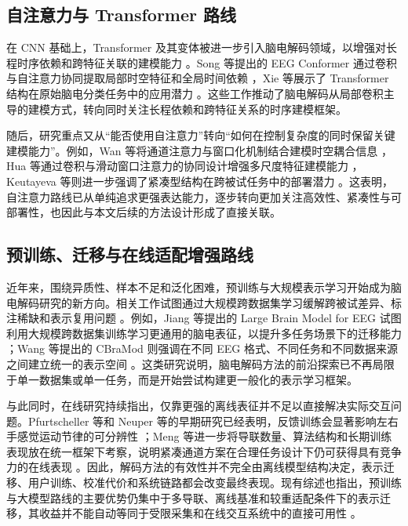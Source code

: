 \subsection{自注意力与 Transformer 路线}

在 CNN 基础上，Transformer 及其变体被进一步引入脑电解码领域，以增强对长程时序依赖和跨特征关联的建模能力 \cite{vaswani2017attention}。Song 等提出的 EEG Conformer 通过卷积与自注意力协同提取局部时空特征和全局时间依赖 \cite{songEEG2022}，Xie 等展示了 Transformer 结构在原始脑电分类任务中的应用潜力 \cite{xie_transformer-based_2022}。这些工作推动了脑电解码从局部卷积主导的建模方式，转向同时关注长程依赖和跨特征关系的时序建模框架。

随后，研究重点又从“能否使用自注意力”转向“如何在控制复杂度的同时保留关键建模能力”。例如，Wan 等将通道注意力与窗口化机制结合建模时空耦合信息 \cite{wan2023novel}，Hua 等通过卷积与滑动窗口注意力的协同设计增强多尺度特征建模能力 \cite{hua2023improved}，Keutayeva 等则进一步强调了紧凑型结构在跨被试任务中的部署潜力 \cite{keu2024compact}。这表明，自注意力路线已从单纯追求更强表达能力，逐步转向更加关注高效性、紧凑性与可部署性，也因此与本文后续的方法设计形成了直接关联。

\subsection{预训练、迁移与在线适配增强路线}

近年来，围绕异质性、样本不足和泛化困难，预训练与大规模表示学习开始成为脑电解码研究的新方向。相关工作试图通过大规模跨数据集学习缓解跨被试差异、标注稀缺和表示复用问题 \cite{Jia24, Wan24b}。例如，Jiang 等提出的 Large Brain Model for EEG 试图利用大规模跨数据集训练学习更通用的脑电表征，以提升多任务场景下的迁移能力 \cite{Jia24}；Wang 等提出的 CBraMod 则强调在不同 EEG 格式、不同任务和不同数据来源之间建立统一的表示空间 \cite{Wan24b}。这类研究说明，脑电解码方法的前沿探索已不再局限于单一数据集或单一任务，而是开始尝试构建更一般化的表示学习框架。

与此同时，在线研究持续指出，仅靠更强的离线表征并不足以直接解决实际交互问题。Pfurtscheller 等和 Neuper 等的早期研究已经表明，反馈训练会显著影响左右手感觉运动节律的可分辨性 \cite{Pfu97, Neu99}；Meng 等进一步将导联数量、算法结构和长期训练表现放在统一框架下考察，说明紧凑通道方案在合理任务设计下仍可获得具有竞争力的在线表现 \cite{Men18}。因此，解码方法的有效性并不完全由离线模型结构决定，表示迁移、用户训练、校准代价和系统链路都会改变最终表现。现有综述也指出，预训练与大模型路线的主要优势仍集中于多导联、离线基准和较重适配条件下的表示迁移，其收益并不能自动等同于受限采集和在线交互系统中的直接可用性 \cite{Liu26b}。

